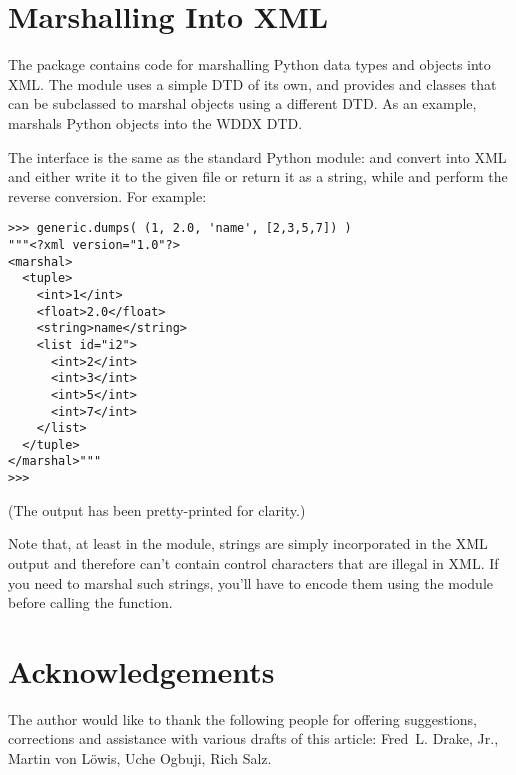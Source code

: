 \documentclass{howto}
\begin{document}
\begin{comment}


\begin{seealso}
  \seetitle[http://www.w3.org/Style/XSL/]
           {The Extensible Stylesheet Language (XSL)}
           {The W3C's overview page on XSL has links to the XSLT
            specifications and to friendlier tutorials.}
\end{seealso}

\end{comment}

\section{Marshalling Into XML}

The  package contains code for marshalling Python
data types and objects into XML.  The 
module uses a simple DTD of its own, and provides 
and  classes that can be subclassed to marshal
objects using a different DTD.  As an example,  
marshals Python objects into the WDDX DTD.

The interface is the same as the standard Python 
module:  and
 convert  into XML and either
write it to the given file or return it as a string, while
 and 
perform the reverse conversion.  For example:

\begin{verbatim}
>>> generic.dumps( (1, 2.0, 'name', [2,3,5,7]) )
"""<?xml version="1.0"?>
<marshal>
  <tuple>
    <int>1</int>
    <float>2.0</float>
    <string>name</string>
    <list id="i2">
      <int>2</int>
      <int>3</int>
      <int>5</int>
      <int>7</int>
    </list>
  </tuple>
</marshal>"""
>>>
\end{verbatim}

(The output has been pretty-printed for clarity.)

Note that, at least in the  module, strings are simply
incorporated in the XML output and therefore can't contain control
characters that are illegal in XML.  If you need to marshal such
strings, you'll have to encode them using the  module
before calling the  function. 


\section{Acknowledgements \label{section-acks}}

The author would like to thank the following people for offering
suggestions, corrections and assistance with various drafts of this
article: Fred~L. Drake, Jr., Martin von L\"owis, 
Uche Ogbuji, Rich Salz.
\end{document}

